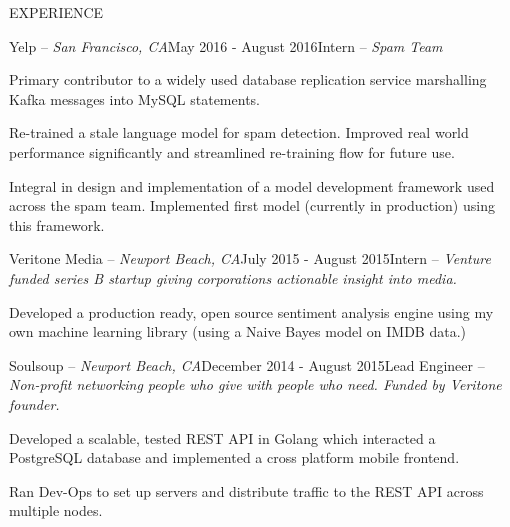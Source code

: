 \documentclass{resume} %
\begin{document}
 
 
\begin{rSection}{EXPERIENCE}

\begin{rSubsection}{Yelp -- {\it San Francisco, CA}}{May 2016 - August 2016}{Intern -- {\sl Spam Team}}

\item Primary contributor to a widely used database replication service marshalling Kafka messages into MySQL
    statements.
\item Re-trained a stale language model for spam detection. Improved real world performance significantly
    and streamlined re-training flow for future use.
\item Integral in design and implementation of a model development framework used across the spam team. Implemented
    first model (currently in production) using this framework.
\end{rSubsection}

\begin{rSubsection}{Veritone Media -- {\it Newport Beach, CA}}{July 2015 - August 2015}{Intern -- {\sl Venture funded series B startup giving corporations actionable insight into media.}}

\item Developed a production ready, open source sentiment analysis engine using my own machine learning library (using a Naive Bayes model on IMDB data.)
\end{rSubsection}

\begin{rSubsection}{Soulsoup -- {\it Newport Beach, CA}}{December 2014 - August 2015}{Lead Engineer -- {\sl Non-profit networking people who give with people who need. Funded by Veritone founder.}}

\item Developed a scalable, tested REST API in Golang which interacted a PostgreSQL database and implemented a
    cross platform mobile frontend.
\item Ran Dev-Ops to set up servers and distribute traffic to the REST API across multiple nodes.
\end{rSubsection} 

\end{rSection}
\end{document}
